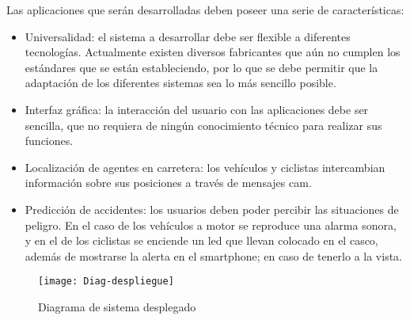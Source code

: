Las aplicaciones que serán desarrolladas deben poseer una serie de
características:
\begin{itemize}
	\item Universalidad: el sistema a desarrollar debe ser flexible a diferentes
	tecnologías. Actualmente existen diversos fabricantes que aún no cumplen los
	estándares que se están estableciendo, por lo que se debe permitir que la
	adaptación de los diferentes sistemas sea lo más sencillo posible.

	\item Interfaz gráfica: la interacción del usuario con las aplicaciones debe
	ser sencilla, que no requiera de ningún conocimiento técnico para realizar sus
	funciones.

	\item Localización de agentes en carretera: los vehículos y ciclistas
	intercambian información sobre sus posiciones a través de mensajes \gls{cam}.

	\item Predicción de accidentes: los usuarios deben poder percibir las
	situaciones de peligro. En el caso de los vehículos a motor se reproduce una
	alarma sonora, y en el de los ciclistas se enciende un led que llevan colocado
	en el casco, además de mostrarse la alerta en el smartphone; en caso de
	tenerlo a la vista.
\end{itemize}

\begin{figure}[h]
	\begin{center}
			\texttt{[image: Diag-despliegue]}
		\caption{Diagrama de sistema desplegado}
		\label{fig:despliegue}
	\end{center}
\end{figure}

\FloatBarrier

